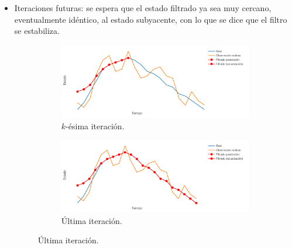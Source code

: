 \begin{itemize}
    \item Iteraciones futuras: se espera que el estado filtrado ya sea muy cercano, eventualmente idéntico, al estado subyacente, con lo que se dice que el filtro se estabiliza.
    \begin{figure}[h!]
        \centering
        \begin{subfigure}[b]{.49\linewidth}
        \centering
            \includegraphics[width=\linewidth]{img/content/chapter2/filt25.pdf}
            \caption{$k$-ésima iteración.}
        \end{subfigure}
        \begin{subfigure}[b]{.49\linewidth}
        \centering
            \includegraphics[width=\linewidth]{img/content/chapter2/filt26.pdf}
            \caption{Última iteración.}
        \end{subfigure}
    \end{figure}
\end{itemize}

